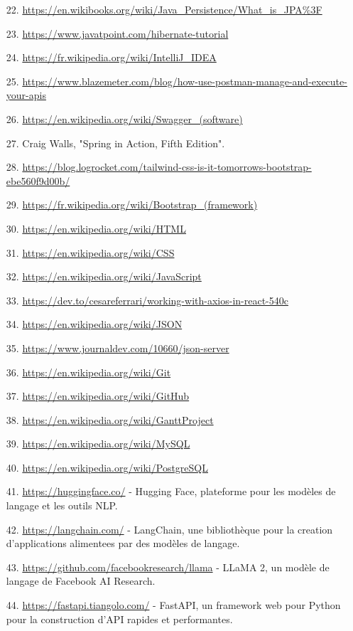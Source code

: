 \documentclass[a4paper, 11pt, openany]{report}
\begin{document}
\begin{itemize}
    \item[22.] \url{https://en.wikibooks.org/wiki/Java_Persistence/What_is_JPA%3F}
    \item[23.] \url{https://www.javatpoint.com/hibernate-tutorial}
    \item[24.] \url{https://fr.wikipedia.org/wiki/IntelliJ_IDEA}
    \item[25.] \url{https://www.blazemeter.com/blog/how-use-postman-manage-and-execute-your-apis}
    \item[26.] \url{https://en.wikipedia.org/wiki/Swagger_(software)}
    \item[27.] Craig Walls, "Spring in Action, Fifth Edition".
    \item[28.] \url{https://blog.logrocket.com/tailwind-css-is-it-tomorrows-bootstrap-ebe560f9d00b/}
    \item[29.] \url{https://fr.wikipedia.org/wiki/Bootstrap_(framework)}
    \item[30.] \url{https://en.wikipedia.org/wiki/HTML}
    \item[31.] \url{https://en.wikipedia.org/wiki/CSS}
    \item[32.] \url{https://en.wikipedia.org/wiki/JavaScript}
    \item[33.] \url{https://dev.to/cesareferrari/working-with-axios-in-react-540c}
    \item[34.] \url{https://en.wikipedia.org/wiki/JSON}
    \item[35.] \url{https://www.journaldev.com/10660/json-server}
    \item[36.] \url{https://en.wikipedia.org/wiki/Git}
    \item[37.] \url{https://en.wikipedia.org/wiki/GitHub}
    \item[38.] \url{https://en.wikipedia.org/wiki/GanttProject}
    \item[39.] \url{https://en.wikipedia.org/wiki/MySQL}
    \item[40.] \url{https://en.wikipedia.org/wiki/PostgreSQL}
    \item[41.] \url{https://huggingface.co/} - Hugging Face, plateforme pour les modèles de langage et les outils NLP.
    \item[42.] \url{https://langchain.com/} - LangChain, une bibliothèque pour la creation d'applications alimentees par des modèles de langage.
    \item[43.] \url{https://github.com/facebookresearch/llama} - LLaMA 2, un modèle de langage de Facebook AI Research.
    \item[44.] \url{https://fastapi.tiangolo.com/} - FastAPI, un framework web pour Python pour la construction d'API rapides et performantes.
\end{itemize}
\end{document}
